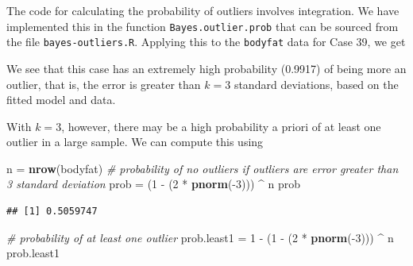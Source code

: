 \documentclass[]{book}
\newenvironment{Shaded}{\begin{snugshade}}{\end{snugshade}}
\newcommand{\KeywordTok}[1]{\textcolor[rgb]{0.13,0.29,0.53}{\textbf{{#1}}}}
\newcommand{\DecValTok}[1]{\textcolor[rgb]{0.00,0.00,0.81}{{#1}}}
\newcommand{\StringTok}[1]{\textcolor[rgb]{0.31,0.60,0.02}{{#1}}}
\newcommand{\CommentTok}[1]{\textcolor[rgb]{0.56,0.35,0.01}{\textit{{#1}}}}
\newcommand{\NormalTok}[1]{{#1}}
\theoremstyle{definition}
\theoremstyle{definition}
\theoremstyle{definition}
\theoremstyle{remark}
\begin{document}
The code for calculating the probability of outliers involves
integration. We have implemented this in the function
\texttt{Bayes.outlier.prob} that can be sourced from the file
\texttt{bayes-outliers.R}. Applying this to the \texttt{bodyfat} data
for Case 39, we get

\begin{Shaded}
\end{Shaded}

We see that this case has an extremely high probability (0.9917) of
being more an outlier, that is, the error is greater than \(k=3\)
standard deviations, based on the fitted model and data.

With \(k=3\), however, there may be a high probability a priori of at
least one outlier in a large sample. We can compute this using

\begin{Shaded}
\begin{Highlighting}[]
\NormalTok{n =}\StringTok{ }\KeywordTok{nrow}\NormalTok{(bodyfat)}
\CommentTok{# probability of no outliers if outliers are error greater than 3 standard deviation}
\NormalTok{prob =}\StringTok{ }\NormalTok{(}\DecValTok{1} \NormalTok{-}\StringTok{ }\NormalTok{(}\DecValTok{2} \NormalTok{*}\StringTok{ }\KeywordTok{pnorm}\NormalTok{(-}\DecValTok{3}\NormalTok{))) ^}\StringTok{ }\NormalTok{n}
\NormalTok{prob}
\end{Highlighting}
\end{Shaded}

\begin{verbatim}
## [1] 0.5059747
\end{verbatim}

\begin{Shaded}
\begin{Highlighting}[]
\CommentTok{# probability of at least one outlier}
\NormalTok{prob.least1 =}\StringTok{ }\DecValTok{1} \NormalTok{-}\StringTok{ }\NormalTok{(}\DecValTok{1} \NormalTok{-}\StringTok{ }\NormalTok{(}\DecValTok{2} \NormalTok{*}\StringTok{ }\KeywordTok{pnorm}\NormalTok{(-}\DecValTok{3}\NormalTok{))) ^}\StringTok{ }\NormalTok{n}
\NormalTok{prob.least1}
\end{Highlighting}
\end{Shaded}
\end{document}

